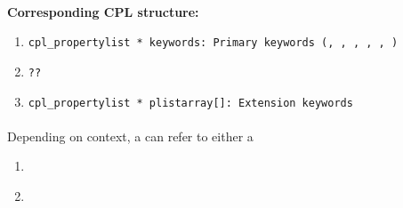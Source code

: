 \paragraph{\hyperref[dataitem:n_distortion_table]{}}\label{drsstructure:N_DISTORTION_TABLE}
\begin{datastructdef}
\textbf{Corresponding \ac{CPL} structure:}
\begin{enumerate}
    \item \texttt{cpl\_propertylist * keywords: Primary keywords (\hyperref[fits:dpr.catg]{},  \hyperref[fits:dpr.tech]{},  \hyperref[fits:dpr.type]{},  \hyperref[fits:ins.opti3.name]{},  \hyperref[fits:ins.opti9.name]{},  \hyperref[fits:ins.opti10.name]{})}
    \item \texttt{??}
    \item \texttt{cpl\_propertylist * plistarray[]: Extension keywords}
\end{enumerate}
\end{datastructdef}    

\paragraph{\hyperref[dataitem:det_distortion_map]{}}\label{dataitem:det_distortion_map}
Depending on context, a \hyperref[dataitem:det_distortion_map]{} can refer to either a
\begin{enumerate}
\item \hyperref[dataitem:n_distortion_map]{}
\item \hyperref[dataitem:lm_distortion_map]{}
\end{enumerate}


\paragraph{\hyperref[dataitem:lm_distortion_map]{}}\label{dataitem:lm_distortion_map}

